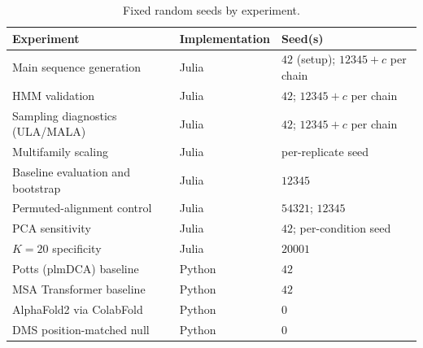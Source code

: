 \documentclass[10pt]{article}
\begin{document}
\begin{table}[ht]
\centering
\caption{Fixed random seeds by experiment.}
\label{tab:seeds}
\small
\begin{tabular}{@{}lll@{}}
\toprule
Experiment & Implementation & Seed(s) \\
\midrule
Main sequence generation             & Julia  & $42$ (setup); $12345{+}c$ per chain \\
HMM validation                       & Julia  & $42$; $12345{+}c$ per chain \\
Sampling diagnostics (ULA/MALA)      & Julia  & $42$; $12345{+}c$ per chain \\
Multifamily scaling                  & Julia  & per-replicate seed \\
Baseline evaluation and bootstrap    & Julia  & $12345$ \\
Permuted-alignment control           & Julia  & $54321$; $12345$ \\
PCA sensitivity                      & Julia  & $42$; per-condition seed \\
$K{=}20$ specificity                 & Julia  & $20001$ \\
Potts (plmDCA) baseline              & Python & $42$ \\
MSA Transformer baseline             & Python & $42$ \\
AlphaFold2 via ColabFold             & Python & $0$ \\
DMS position-matched null            & Python & $0$ \\
\bottomrule
\end{tabular}
\end{table}



\end{document}
